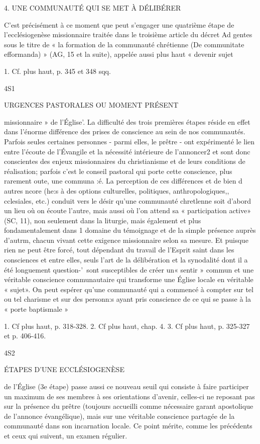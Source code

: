 {{4.	UNE COMMUNAUTÉ QUI SE MET À DÉLIBÉRER

C'est précisément à ce moment que peut s'engager une quatrième étape de l'ecclésiogenèse missionnaire traitée dans le troisième article du décret Ad gentes sous le titre de « la formation de la communauté chrétienne (De communitate efformanda) » (AG, 15 et la suite), appelée aussi plus haut « devenir sujet

1. Cf. plus haut, p. 345 et 348 sqq.

4S1
 
URGENCES PASTORALES OU MOMENT PRÉSENT

missionnaire » de l'Église'. La difficulté des trois premières étapes réside en effet dans l'énorme différence des prises de conscience au sein de nos communautés. Parfois seules certaines personnes
-	parmi elles, le prêtre -	ont expérimenté le lien entre l'écoute de l'Évangile et la nécessité intérieure de l'annoncer2 et sont donc conscientes des enjeux missionnaires du christianisme et de leurs conditions de réalisation; parfois c'est le conseil pastoral qui porte cette conscience, plus rarement oute, une communa :é. La perception de ces différences et de bien d autres ncore (he:s à des options culturelles, politiques, anthropologiques,, cclesiales, etc.) conduit vers le désir qu'une communauté chretlenne soit d'abord un lieu où on écoute l'autre, mais aussi où l'on attend sa « participation active» (SC, 11), non seulement dans la liturgie, mais également et plus fondamentalement dans 1 domaine du témoignage et de la simple présence auprès d'autrm, chacun vivant cette exigence missionnaire selon sa mesure. Et puisque rien ne peut être forcé, tout dépendant du travail de l'Esprit saint dans les consciences et entre elles, seuls l'art de la délibération et la synodalité dont il a été longuement question-'\ sont susceptibles de créer un« sentir » commun et une véritable conscience communautaire qui transforme une Église locale en véritable « sujet».
On peut espérer qu'une communauté qui a commencé à compter sur tel ou tel charisme et sur des personn:s ayant pris conscience de ce qui se passe à la « porte baptismale »

1.	Cf plus haut, p. 318-328.
2.	Cf plus haut, chap. 4.
3.	Cf plus haut, p. 325-327 et p. 406-416.

4S2
 
ÉTAPES D'UNE ECCLÉSIOGENÈSE

de l'Église (3e étape) passe aussi ce nouveau seuil qui consiste à faire participer un maximum de ses membres à ses orientations d'avenir, celles-ci ne reposant pas sur la présence du prêtre (toujours accueilli comme nécessaire garant apostolique de l'annonce évangélique), mais sur une véritable conscience partagée de la communauté dans son incarnation locale. Ce
point mérite, comme les précédents et ceux qui suivent, un examen régulier.

}}
